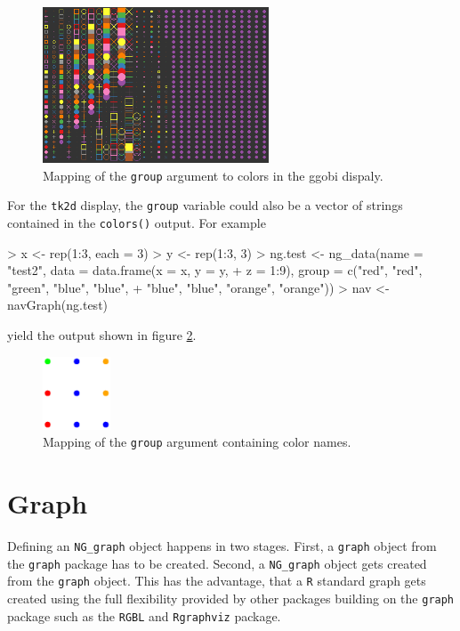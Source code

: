 \documentclass[12pt,oneside,titlepage,letter]{article}
\newcommand{\modify}[1]{{\color{blue}#1}}
\begin{document}
\begin{figure}[h]
  \label{fig:ggobicolors}
  \centering
  \includegraphics[width = 0.6\textwidth]{img/ggobicolors.png}
  \caption{Mapping of the \texttt{group} argument to colors in the ggobi dispaly.}  
\end{figure}

For the \modify{\texttt{tk2d}} display, the \texttt{group} variable could also be a vector of strings contained in the \texttt{colors()} output. For example

\begin{Schunk}
\begin{Sinput}
> x <- rep(1:3, each = 3)
> y <- rep(1:3, 3)
> ng.test <- ng_data(name = "test2", data = data.frame(x = x, y = y, 
+     z = 1:9), group = c("red", "red", "green", "blue", "blue", 
+     "blue", "blue", "orange", "orange"))
> nav <- navGraph(ng.test)
\end{Sinput}
\end{Schunk}

yield the output shown in figure \ref{fig:tk2dCols2}.

\begin{figure}[h]
  \label{fig:tk2dCols2}
  \centering
  \includegraphics[width = 2cm]{img/tk2dcolors2.png}
  \caption{Mapping of the \texttt{group} argument containing color names.}  
\end{figure}


\section{Graph}
Defining an \texttt{NG\_graph} object happens in two stages. First, a \texttt{graph} object from the \texttt{graph} package has to be created. Second, a \texttt{NG\_graph} object gets created from the \texttt{graph} object. This has the advantage, that a \texttt{R} standard graph gets created using the full flexibility provided by other packages building on the \texttt{graph} package such as the \texttt{RGBL} and \texttt{Rgraphviz} package. 
\end{document}
